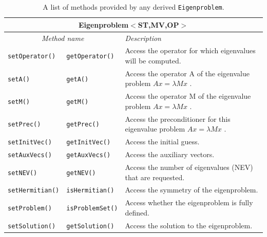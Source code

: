 \documentclass[acmtoms]{acmtrans2m}
\newcommand{\aspace}[1]{\texttt{#1}}
\begin{document}
\begin{table}[htb]
\begin{center}
  \caption{A list of methods provided by any derived \aspace{Eigenproblem}.} 
\label{tab:anasazi:eigenproblem}
\begin{tabular}{| p{2cm}  p{2cm} | p{6cm} |}
\hline
\multicolumn{3}{|c|}{\textbf{Eigenproblem$<$ST,MV,OP$>$}} \\\hline
\multicolumn{2}{|c|}{\emph{Method name}} & \emph{Description} \\
\hline
{\tt setOperator()}&{\tt getOperator()}    & Access the operator for which eigenvalues will be computed. \\
{\tt setA()}&{\tt getA()}                  & Access the operator A of the eigenvalue problem $Ax=\lambda Mx$ . \\
{\tt setM()}&{\tt getM()}                  & Access the operator M of the eigenvalue problem $Ax=\lambda Mx$ . \\
{\tt setPrec()}&{\tt getPrec()}            & Access the preconditioner for this eigenvalue problem $Ax=\lambda Mx$ . \\
{\tt setInitVec()}&{\tt getInitVec()}      & Access the initial guess. \\
{\tt setAuxVecs()}&{\tt getAuxVecs()}      & Access the auxiliary vectors. \\
{\tt setNEV()}&{\tt getNEV()}              & Access the number of eigenvalues (NEV) that are requested.  \\
{\tt setHermitian()}&{\tt isHermitian()}   & Access the symmetry of the eigenproblem. \\
{\tt setProblem()}&{\tt isProblemSet()}    & Access whether the eigenproblem is fully defined.  \\
{\tt setSolution()}&{\tt getSolution()}    & Access the solution to the eigenproblem. \\
\hline
\end{tabular}
\end{center}
\end{table}
\end{document}
